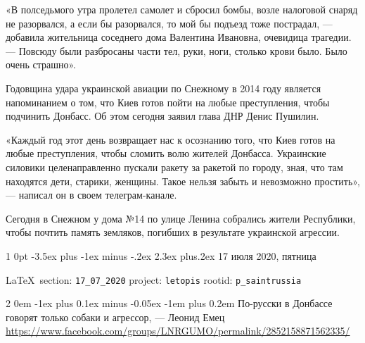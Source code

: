 \documentclass[a4paper,11pt]{extreport}
\makeatletter
\renewcommand\section{%
  \clearpage
  \@startsection{section}%
    {1}%
    {0pt}%
    {-3.5ex plus -1ex minus -.2ex}%
    {2.3ex plus.2ex}%
    {\centering\normalfont\Huge\bfseries}%
}
\renewcommand\subsection{%
  \clearpage
    \@startsection{subsection}%
    {2}%
    {0em}%
    {-1ex plus 0.1ex minus -0.05ex}%
    {-1em plus 0.2em}%
    {\scshape\bfseries\Large}%
}
\makeatother
\begin{document}
«В полседьмого утра пролетел самолет и сбросил бомбы, возле налоговой снаряд не
разорвался, а если бы разорвался, то мой бы подъезд тоже пострадал, --- добавила
жительница соседнего дома Валентина Ивановна, очевидица трагедии. --- Повсюду
были разбросаны части тел, руки, ноги, столько крови было. Было очень страшно».

Годовщина удара украинской авиации по Снежному в 2014 году является
напоминанием о том, что Киев готов пойти на любые преступления, чтобы подчинить
Донбасс. Об этом сегодня заявил глава ДНР Денис Пушилин.

«Каждый год этот день возвращает нас к осознанию того, что Киев готов на любые
преступления, чтобы сломить волю жителей Донбасса. Украинские силовики
целенаправленно пускали ракету за ракетой по городу, зная, что там находятся
дети, старики, женщины. Такое нельзя забыть и невозможно простить», --- написал
он в своем телеграм-канале.

Сегодня в Снежном у дома №14 по улице Ленина собрались жители Республики, чтобы
почтить память земляков, погибших в результате украинской агрессии.



 
 

\section{17 июля 2020, пятница}
\label{sec:17_07_2020}

  
\vspace{0.5cm}
{\ifDEBUG\small\LaTeX~section: \verb|17_07_2020| project: \verb|letopis| rootid: \verb|p_saintrussia|\fi}
\vspace{0.5cm}

 
 
\subsection{По-русски в Донбассе говорят только собаки и агрессор, --- Леонид Емец}
\label{sec:17_07_2020.fb.lnr.1}
\url{https://www.facebook.com/groups/LNRGUMO/permalink/2852158871562335/}
  
\end{document}
